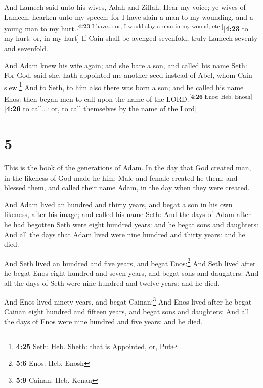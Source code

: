  And Lamech said unto his wives, Adah and Zillah, Hear my
voice; ye wives of Lamech, hearken unto my speech: for I have slain a
man to my wounding, and a young man to my
hurt.\textsuperscript{{[}\textbf{4:23} I have\ldots: or, I would slay a
man in my wound, etc.{]}}{[}\textbf{4:23} to my hurt: or, in my hurt{]}
 If Cain shall be avenged sevenfold, truly Lamech seventy
and sevenfold.

 And Adam knew his wife again; and she bare a son, and
called his name Seth: For God, said she, hath appointed me another seed
instead of Abel, whom Cain slew.\footnote{\textbf{4:25} Seth: Heb.
  Sheth: that is Appointed, or, Put}  And to Seth, to him
also there was born a son; and he called his name Enos: then began men
to call upon the name of the LORD.\textsuperscript{{[}\textbf{4:26}
Enos: Heb. Enosh{]}}{[}\textbf{4:26} to call\ldots: or, to call
themselves by the name of the Lord{]}

\hypertarget{section-4}{%
\section{5}\label{section-4}}

 This is the book of the generations of Adam. In the day
that God created man, in the likeness of God made he him; 
Male and female created he them; and blessed them, and called their name
Adam, in the day when they were created.

 And Adam lived an hundred and thirty years, and begat a
son in his own likeness, after his image; and called his name Seth:
 And the days of Adam after he had begotten Seth were
eight hundred years: and he begat sons and daughters:  And
all the days that Adam lived were nine hundred and thirty years: and he
died.

 And Seth lived an hundred and five years, and begat
Enos:\footnote{\textbf{5:6} Enos: Heb. Enosh}  And Seth
lived after he begat Enos eight hundred and seven years, and begat sons
and daughters:  And all the days of Seth were nine hundred
and twelve years: and he died.

 And Enos lived ninety years, and begat Cainan:\footnote{\textbf{5:9}
  Cainan: Heb. Kenan}  And Enos lived after he begat
Cainan eight hundred and fifteen years, and begat sons and daughters:
 And all the days of Enos were nine hundred and five
years: and he died.

